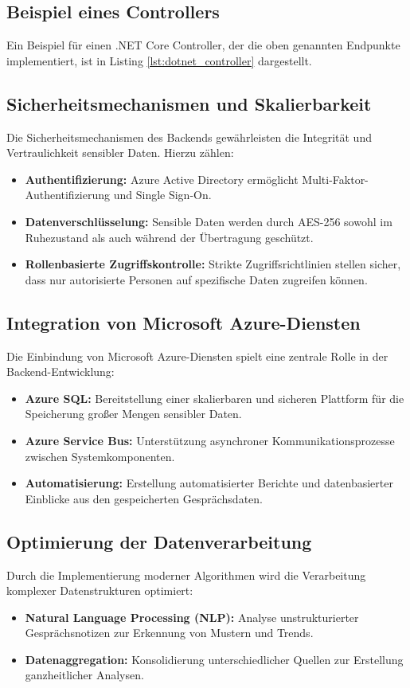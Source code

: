 \subsection{Beispiel eines Controllers}
Ein Beispiel für einen .NET Core Controller, der die oben genannten Endpunkte implementiert, ist in Listing \ref{lst:dotnet_controller} dargestellt.




\subsection{Sicherheitsmechanismen und Skalierbarkeit}
Die Sicherheitsmechanismen des Backends gewährleisten die Integrität und Vertraulichkeit sensibler Daten. Hierzu zählen:
\begin{itemize}
    \item \textbf{Authentifizierung:} Azure Active Directory ermöglicht Multi-Faktor-Authentifizierung und Single Sign-On.
    \item \textbf{Datenverschlüsselung:} Sensible Daten werden durch AES-256 sowohl im Ruhezustand als auch während der Übertragung geschützt.
    \item \textbf{Rollenbasierte Zugriffskontrolle:} Strikte Zugriffsrichtlinien stellen sicher, dass nur autorisierte Personen auf spezifische Daten zugreifen können.
\end{itemize}

\subsection{Integration von Microsoft Azure-Diensten}
Die Einbindung von Microsoft Azure-Diensten spielt eine zentrale Rolle in der Backend-Entwicklung:
\begin{itemize}
    \item \textbf{Azure SQL:} Bereitstellung einer skalierbaren und sicheren Plattform für die Speicherung großer Mengen sensibler Daten.
    \item \textbf{Azure Service Bus:} Unterstützung asynchroner Kommunikationsprozesse zwischen Systemkomponenten.
    \item \textbf{Automatisierung:} Erstellung automatisierter Berichte und datenbasierter Einblicke aus den gespeicherten Gesprächsdaten.
\end{itemize}

\subsection{Optimierung der Datenverarbeitung}
Durch die Implementierung moderner Algorithmen wird die Verarbeitung komplexer Datenstrukturen optimiert:
\begin{itemize}
    \item \textbf{Natural Language Processing (NLP):} Analyse unstrukturierter Gesprächsnotizen zur Erkennung von Mustern und Trends.
    \item \textbf{Datenaggregation:} Konsolidierung unterschiedlicher Quellen zur Erstellung ganzheitlicher Analysen.
\end{itemize}

